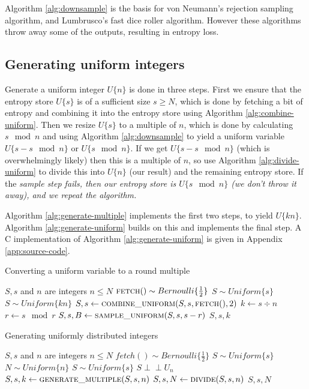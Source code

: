 \documentclass[12pt]{article}
\newcommand{\indep}{\perp\!\!\!\perp}
\begin{document}
Algorithm \ref{alg:downsample} is the basis for von Neumann's rejection sampling algorithm, and Lumbrusco's fast dice roller algorithm. However these algorithms throw away some of the outputs, resulting in entropy loss.

\subsection{Generating uniform integers}

Generate a uniform integer $U\{n\}$ is done in three steps. First we ensure that the entropy store $U\{s\}$ is of a sufficient size $s\ge N$, which is done by fetching a bit of entropy and combining it into the entropy store using Algorithm \ref{alg:combine-uniform}. Then we resize $U\{s\}$ to a multiple of $n$, which is done by calculating $s \mod n$ and using Algorithm \ref{alg:downsample} to yield a uniform variable $U\{s-s \mod n\}$ or $U\{s \mod n\}$. If we get $U\{s-s \mod n\}$ (which is overwhelmingly likely) then this is a multiple of $n$, so use Algorithm \ref{alg:divide-uniform} to divide this into $U\{n\}$ (our result) and the remaining entropy store. If the \em sample \em step fails, then our entropy store is $U\{s \mod n\}$ (we don't throw it away), and we repeat the algorithm.

Algorithm \ref{alg:generate-multiple} implements the first two steps, to yield $U\{kn\}$. Algorithm \ref{alg:generate-uniform} builds on this and implements the final step. A C implementation of Algorithm \ref{alg:generate-uniform} is given in Appendix \ref{app:source-code}.

\begin{algorithm}
\caption{Converting a uniform variable to a round multiple}
\label{alg:generate-multiple}
\begin{algorithmic}[1]
\Require $S, s$ and $n$ are integers
\Require $n \le N$
\Require $\textsc{fetch}() \sim Bernoulli\{\frac{1}{2}\}$
\Require $S \sim Uniform\{s\}$
\Ensure $S \sim Uniform\{kn\}$
        \State $S, s \gets \textsc{combine\_uniform}(S, s, \textsc{fetch}(), 2)$
    \EndWhile
    \State $k \gets s \div n$
    \State $r \gets s \mod r$
    \State $S, s, B \gets \textsc{sample\_uniform}(S, s, s-r)$ 
        \State \Return $S, s, k$
    \EndIf
  \EndWhile
\EndProcedure
\end{algorithmic}
\end{algorithm}

\begin{algorithm}
\caption{Generating uniformly distributed integers}
\label{alg:generate-uniform}
\begin{algorithmic}[1]
\Require $S, s$ and $n$ are integers
\Require $n \le N$
\Require $fetch() \sim Bernoulli\{\frac{1}{2}\}$
\Require $S \sim Uniform\{s\}$
\Ensure $N \sim Uniform\{n\}$
\Ensure $S \sim Uniform\{s\}$
\Ensure $S \indep U_n$
  \State $S, s, k \gets \textsc{generate\_multiple}(S, s, n)$
  \State $S, s, N \gets \textsc{divide}(S, s, n)$
  \State \Return $S, s, N$
\EndProcedure
\end{algorithmic}
\end{algorithm}
\end{document}
